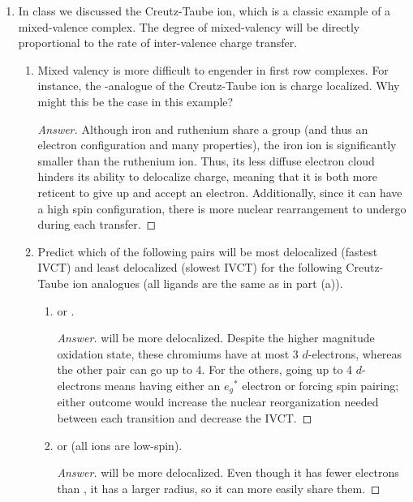 \documentclass[../psets.tex]{subfiles}
\begin{document}
\begin{enumerate}
\begin{proof}[Answer]
    \end{proof}
    \item In class we discussed the Creutz-Taube ion, which is a classic example of a mixed-valence complex. The degree of mixed-valency will be directly proportional to the rate of inter-valence charge transfer.
    \begin{enumerate}
        \item Mixed valency is more difficult to engender in first row complexes. For instance, the -analogue of the Creutz-Taube ion  is charge localized. Why might this be the case in this  example?
        \begin{proof}[Answer]
            Although iron and ruthenium share a group (and thus an electron configuration and many properties), the iron ion is significantly smaller than the ruthenium ion. Thus, its less diffuse electron cloud hinders its ability to delocalize charge, meaning that it is both more reticent to give up and accept an electron. Additionally, since it can have a high spin configuration, there is more nuclear rearrangement to undergo during each transfer.
        \end{proof}
        \item Predict which of the following pairs will be most delocalized (fastest IVCT) and least delocalized (slowest IVCT) for the following Creutz-Taube ion analogues (all ligands are the same as in part (a)).
        \begin{enumerate}
            \item {} or .
            \begin{proof}[Answer]
                 will be more delocalized. Despite the higher magnitude oxidation state, these chromiums have at most 3 $d$-electrons, whereas the other pair can go up to 4. For the others, going up to 4 $d$-electrons means having either an ${e_g}^*$ electron or forcing spin pairing; either outcome would increase the nuclear reorganization needed between each transition and decrease the IVCT.
            \end{proof}
            \item {} or  (all ions are low-spin).
            \begin{proof}[Answer]
                 will be more delocalized. Even though it has fewer electrons than , it has a larger radius, so it can more easily share them.
            \end{proof}

\end{enumerate}
\end{enumerate}
\end{enumerate}
\end{document}
